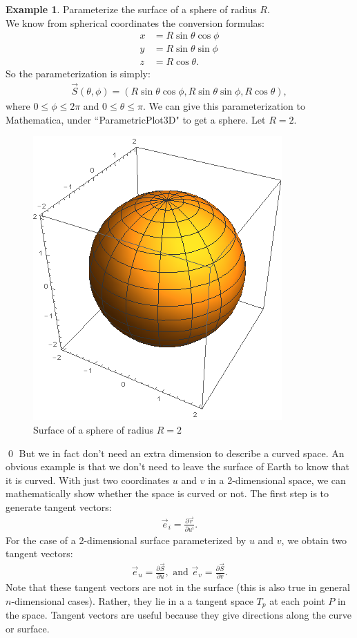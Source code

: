 \documentclass{book}
\theoremstyle{definition}
\newtheorem{exmp}{Example}[section]
\begin{document}
\begin{exmp}
	Parameterize the surface of a sphere of radius $R$.\\
	
	We know from spherical coordinates the conversion formulas:
	\begin{align*}
	x &= R\sin\theta\cos\phi\\
	y &= R\sin\theta\sin\phi\\
	z &= R\cos\theta.
	\end{align*}
	So the parameterization is simply:
	\begin{align*}
	\vec{S}(\theta, \phi) = (R\sin\theta\cos\phi, R\sin\theta\sin\phi, R\cos\theta),
	\end{align*}
	where $0 \leq \phi \leq 2\pi$ and $0\leq \theta \leq \pi$. We can give this parameterization to Mathematica, under ``ParametricPlot3D" to get a sphere. Let $R=2$.
	\begin{figure}[h!]
		\centering
		\includegraphics[scale=0.5]{gr-fig-15.png}
		\caption{Surface of a sphere of radius $R=2$}
	\end{figure}
\end{exmp}\qed
But we in fact don't need an extra dimension to describe a curved space. An obvious example is that we don't need to leave the surface of Earth to know that it is curved. With just two coordinates $u$ and $v$ in a 2-dimensional space, we can mathematically show whether the space is curved or not. The first step is to generate tangent vectors:
\begin{align*}
\vec{e}_i = \frac{\partial \vec{r}}{\partial u^i}.
\end{align*} 
For the case of a 2-dimensional surface parameterized by $u$ and $v$, we obtain two tangent vectors:
\begin{align*}
\vec{e}_u = \frac{\partial \vec{S}}{\partial u}, \text{ and } \vec{e}_v = \frac{\partial \vec{S}}{\partial v}.
\end{align*}
Note that these tangent vectors are not in the surface (this is also true in general $n$-dimensional cases). Rather, they lie in a a tangent space $T_p$ at each point $P$ in the space. Tangent vectors are useful because they give directions along the curve or surface.\\
\end{document}
